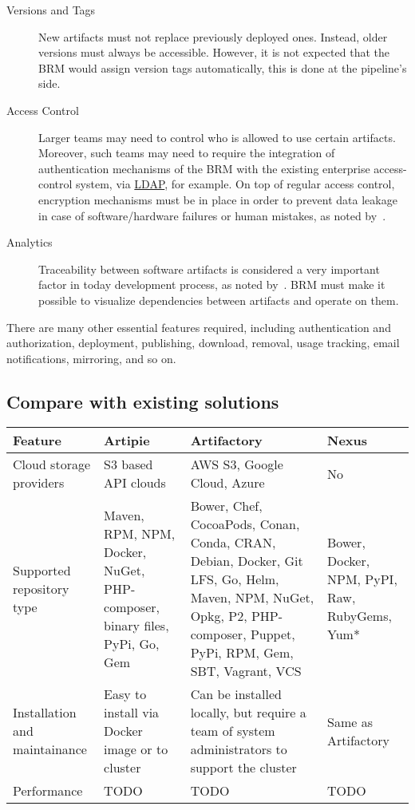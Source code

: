 \documentclass[12pt,oneside]{article}
\begin{document}
\begin{description}
  \item[Versions and Tags]
  New artifacts must not replace previously deployed ones.
  Instead, older versions must always be accessible. However,
  it is not expected that the BRM would assign version tags automatically,
  this is done at the pipeline's side.

  \item[Access Control]
  Larger teams may need to control who is allowed to use certain artifacts.
  Moreover, such teams may need to require the integration of authentication
  mechanisms of the BRM with the existing enterprise access-control system,
  via \href{https://en.wikipedia.org/wiki/Lightweight_Directory_Access_Protocol}{LDAP},
  for example. On top of regular access control, encryption mechanisms must
  be in place in order to prevent data leakage in case of software/hardware
  failures or human mistakes, as noted by~\textcite{paule2018}.

  \item[Analytics]
  Traceability between software artifacts is considered a very
  important factor in today development process, as noted by~\textcite{palihawadana2017}.
  BRM must make it possible to visualize dependencies between artifacts and
  operate on them.
\end{description}

There are many other essential features required, including
authentication and authorization, deployment, publishing,
download, removal, usage tracking, email notifications, mirroring,
and so on.

\subsection{Compare with existing solutions}
\label{ref:comparation}

\begin{tabular}{| l | p{3cm} | p{3cm} | p{3cm} |}
\hline
  Feature & Artipie & Artifactory & Nexus \\
  \hline
  Cloud storage providers & S3 based API clouds & AWS S3, Google Cloud, Azure & No \\
  \hline
  Supported repository type
  & Maven, RPM, NPM, Docker, NuGet, PHP-composer, binary files, PyPi, Go, Gem
  & Bower, Chef, CocoaPods, Conan, Conda, CRAN, Debian, Docker, Git LFS, Go, Helm, Maven, NPM, NuGet, Opkg, P2, PHP-composer, Puppet, PyPi, RPM, Gem, SBT, Vagrant, VCS
  & Bower, Docker, NPM, PyPI, Raw, RubyGems, Yum* \\
  \hline
  Installation and maintainance
  & Easy to install via Docker image or to cluster
  & Can be installed locally, but require a team of system administrators to support the cluster
  & Same as Artifactory \\
  \hline
  Performance & TODO & TODO & TODO \\
  \hline
\end{tabular}
\end{document}
